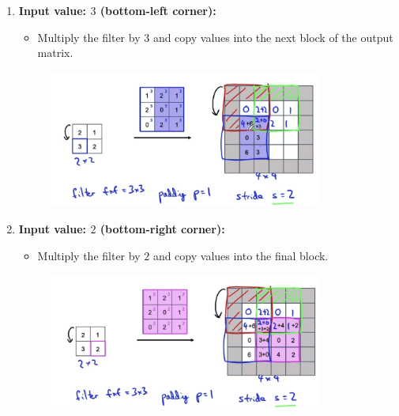 \documentclass[letterpaper,12pt,notitlepage,twoside]{report}
\begin{document}
\begin{enumerate}
    \item \textbf{Input value: $3$ (bottom-left corner):}
    \begin{itemize}
        \item Multiply the filter by $3$ and copy values into the next block of the output matrix.
    \end{itemize}
	\begin{figure}[h]
		\centering
		\includegraphics[width=0.85\textwidth]{Images/Transpose Convolution - Step 3.png}
		\label{fig:49}
	\end{figure}
	\FloatBarrier

    \item \textbf{Input value: $2$ (bottom-right corner):}
    \begin{itemize}
        \item Multiply the filter by $2$ and copy values into the final block.
    \end{itemize}

	\begin{figure}[h]
		\centering
		\includegraphics[width=0.85\textwidth]{Images/Transpose Convolution - Step 4.png}
		\label{fig:50}
	\end{figure}
	\FloatBarrier


\end{enumerate}
\end{document}
